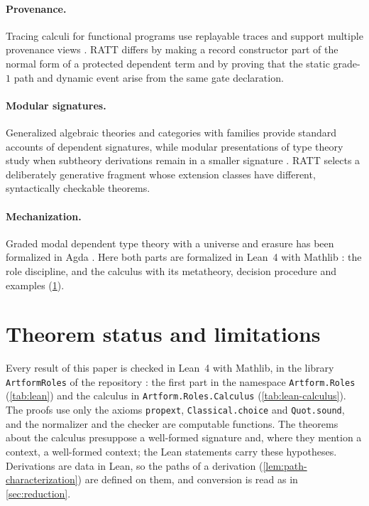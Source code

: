 \documentclass[11pt]{article}
\numberwithin{equation}{section}
\theoremstyle{definition}
\theoremstyle{plain}
\theoremstyle{remark}
\begin{document}
\paragraph{Provenance.}
Tracing calculi for functional programs use replayable traces and support
multiple provenance views \cite{CoreProvenance}.  RATT differs by making a
record constructor part of the normal form of a protected dependent term and
by proving that the static grade-\(1\) path and dynamic event arise from the
same gate declaration.

\paragraph{Modular signatures.}
Generalized algebraic theories and categories with families provide standard
accounts of dependent signatures, while modular presentations of type theory
study when subtheory derivations remain in a smaller signature
\cite{DybjerCwF,ModularTT}.  RATT selects a deliberately generative fragment
whose extension classes have different, syntactically checkable theorems.

\paragraph{Mechanization.}
Graded modal dependent type theory with a universe and erasure has been
formalized in Agda \cite{GradedDTT}.  Here both parts are formalized in
Lean~4 with Mathlib \cite{Lean4,Mathlib}: the role discipline, and the
calculus with its metatheory, decision procedure and examples
(\cref{sec:status}).

\section{Theorem status and limitations}\label{sec:status}

Every result of this paper is checked in Lean~4 with Mathlib, in the library
\texttt{ArtformRoles} of the repository \cite{Repo}: the first part in the
namespace \texttt{Artform.Roles} (\cref{tab:lean}) and the calculus in
\texttt{Artform.Roles.Calculus} (\cref{tab:lean-calculus}).  The proofs use
only the axioms \texttt{propext}, \texttt{Classical.choice} and
\texttt{Quot.sound}, and the normalizer and the checker are computable
functions.  The theorems about the calculus presuppose a well-formed
signature and, where they mention a context, a well-formed context; the Lean
statements carry these hypotheses.  Derivations are data in Lean, so the
paths of a derivation (\cref{lem:path-characterization}) are defined on
them, and conversion is read as in \cref{sec:reduction}.
\end{document}
